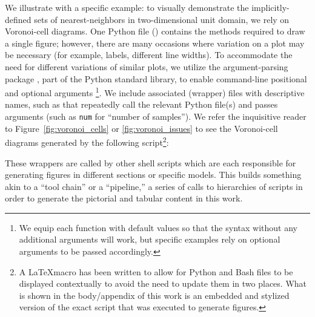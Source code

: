 We illustrate with a specific example: to visually demonstrate the implicitly-defined sets of nearest-neighbors in two-dimensional unit domain, we rely on Voronoi-cell diagrams.
One Python file () contains the methods required to draw a single figure; however, there are many occasions where variation on a plot may be necessary (for example, labels, different line widths).
To accommodate the need for different variations of similar plots, we utilize the argument-parsing package , part of the Python standard library, to enable command-line positional and optional arguments \footnote{We equip each function with default values so that the syntax  without any additional arguments will work, but specific examples rely on optional arguments to be passed accordingly.}.
We include associated (wrapper) files with descriptive names, such as  that repeatedly call the relevant Python file(s) and passes arguments (such as {\tt num} for ``number of samples'').
We refer the inquisitive reader to  Figure~\ref{fig:voronoi_cells} or \ref{fig:voronoi_issues} to see the Voronoi-cell diagrams generated by the following script\footnote{A \LaTeX macro has been written to allow for Python and Bash files to be displayed contextually to avoid the need to update them in two places. What is shown in the body/appendix of this work is an embedded and stylized version of the exact script that was executed to generate figures.}:



These wrappers are called by other shell scripts which are each responsible for generating figures in different sections or specific models.
This builds something akin to a ``tool chain'' or a ``pipeline,'' a series of calls to hierarchies of scripts in order to generate the pictorial and tabular content in this work.


